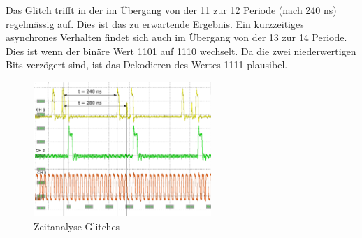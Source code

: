  Das Glitch trifft in der im Übergang von der 11 zur 12 Periode (nach 240 ns) regelmässig auf. Dies ist das zu erwartende Ergebnis. Ein kurzzeitiges asynchrones Verhalten findet sich auch im Übergang von der 13 zur 14 Periode. Dies ist wenn der binäre Wert 1101 auf 1110 wechselt. Da die zwei niederwertigen Bits verzögert sind, ist das Dekodieren des Wertes 1111 plausibel.\\
 
\begin{figure}[H]
	\includegraphics[width=0.6\textwidth]{images/glitch/Glitch_2_timing.png}
	\caption{Zeitanalyse Glitches}
	\label{fig.glitch.result_2}
\end{figure}



